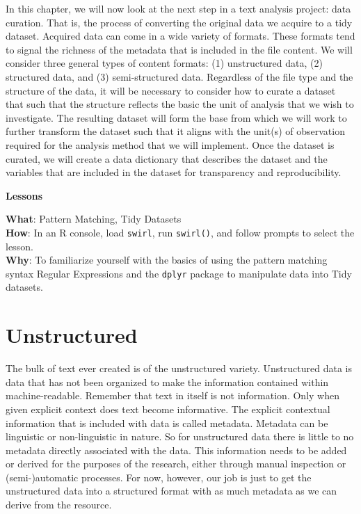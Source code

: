 \documentclass[
  letterpaper,
]{latex/krantz}
\theoremstyle{definition}
\theoremstyle{remark}
\begin{document}
In this chapter, we will now look at the next step in a text analysis
project: data curation. That is, the process of converting the original
data we acquire to a tidy dataset. Acquired data can come in a wide
variety of formats. These formats tend to signal the richness of the
metadata that is included in the file content. We will consider three
general types of content formats: (1) unstructured data, (2) structured
data, and (3) semi-structured data. Regardless of the file type and the
structure of the data, it will be necessary to consider how to curate a
dataset that such that the structure reflects the basic the unit of
analysis that we wish to investigate. The resulting dataset will form
the base from which we will work to further transform the dataset such
that it aligns with the unit(s) of observation required for the analysis
method that we will implement. Once the dataset is curated, we will
create a data dictionary that describes the dataset and the variables
that are included in the dataset for transparency and reproducibility.

\begin{tcolorbox}[enhanced jigsaw, breakable, leftrule=.75mm, arc=.35mm, colframe=quarto-callout-color-frame, colback=white, left=2mm, bottomrule=.15mm, rightrule=.15mm, toprule=.15mm, opacityback=0]

\textbf{ Lessons}

\textbf{What}: Pattern Matching, Tidy Datasets\\
\textbf{How}: In an R console, load \texttt{swirl}, run
\texttt{swirl()}, and follow prompts to select the lesson.\\
\textbf{Why}: To familiarize yourself with the basics of using the
pattern matching syntax Regular Expressions and the \texttt{dplyr}
package to manipulate data into Tidy datasets.

\end{tcolorbox}

\section{Unstructured}\label{unstructured}

The bulk of text ever created is of the unstructured variety.
Unstructured data is data that has not been organized to make the
information contained within machine-readable. Remember that text in
itself is not information. Only when given explicit context does text
become informative. The explicit contextual information that is included
with data is called metadata. Metadata can be linguistic or
non-linguistic in nature. So for unstructured data there is little to no
metadata directly associated with the data. This information needs to be
added or derived for the purposes of the research, either through manual
inspection or (semi-)automatic processes. For now, however, our job is
just to get the unstructured data into a structured format with as much
metadata as we can derive from the resource.
\end{document}
